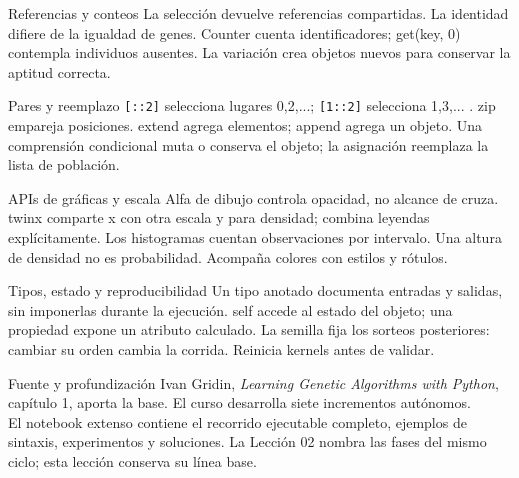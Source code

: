\begin{frame}[fragile]{Referencias y conteos}
La selección devuelve referencias compartidas. La identidad difiere de la igualdad de genes. Counter cuenta identificadores; get(key, 0) contempla individuos ausentes. La variación crea objetos nuevos para conservar la aptitud correcta.
\end{frame}

\begin{frame}[fragile]{Pares y reemplazo}
\texttt{[::2]} selecciona lugares 0,2,...; \texttt{[1::2]} selecciona 1,3,... . zip empareja posiciones. extend agrega elementos; append agrega un objeto. Una comprensión condicional muta o conserva el objeto; la asignación reemplaza la lista de población.
\end{frame}

\begin{frame}[fragile]{APIs de gráficas y escala}
Alfa de dibujo controla opacidad, no alcance de cruza. twinx comparte x con otra escala y para densidad; combina leyendas explícitamente. Los histogramas cuentan observaciones por intervalo. Una altura de densidad no es probabilidad. Acompaña colores con estilos y rótulos.
\end{frame}

\begin{frame}[fragile]{Tipos, estado y reproducibilidad}
Un tipo anotado documenta entradas y salidas, sin imponerlas durante la ejecución. self accede al estado del objeto; una propiedad expone un atributo calculado. La semilla fija los sorteos posteriores: cambiar su orden cambia la corrida. Reinicia kernels antes de validar.
\end{frame}

\begin{frame}[fragile]{Fuente y profundización}
Ivan Gridin, \emph{Learning Genetic Algorithms with Python}, capítulo 1, aporta la base. El curso desarrolla siete incrementos autónomos.\\[0.7em]
El notebook extenso contiene el recorrido ejecutable completo, ejemplos de sintaxis, experimentos y soluciones. La Lección 02 nombra las fases del mismo ciclo; esta lección conserva su línea base.
\end{frame}

